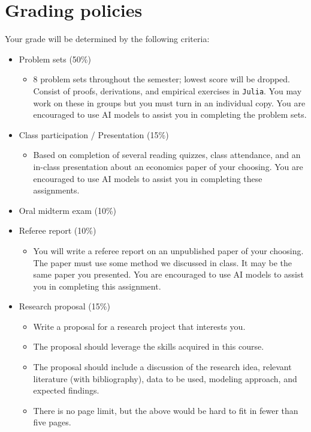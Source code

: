 \documentclass[11pt,english]{article}
\begin{document}
\section*{Grading policies}

Your grade will be determined by the following criteria:

\begin{itemize}
\item Problem sets (50\%)
    \begin{itemize}
        \item 8 problem sets throughout the semester; lowest score will be dropped. Consist of proofs, derivations, and empirical exercises in \texttt{Julia}. You may work on these in groups but you must turn in an individual copy. You are encouraged to use AI models to assist you in completing the problem sets.
    \end{itemize}
\item Class participation / Presentation (15\%)
    \begin{itemize}
        \item Based on completion of several reading quizzes, class attendance, and an in-class presentation about an economics paper of your choosing. You are encouraged to use AI models to assist you in completing these assignments.
    \end{itemize}
\item Oral midterm exam (10\%)
\item Referee report (10\%)
    \begin{itemize}
        \item You will write a referee report on an unpublished paper of your choosing. The paper must use some method we discussed in class. It may be the same paper you presented. You are encouraged to use AI models to assist you in completing this assignment.
    \end{itemize}
\item Research proposal (15\%)
    \begin{itemize}
        \item Write a proposal for a research project that interests you.
        \item The proposal should leverage the skills acquired in this course.
        \item The proposal should include a discussion of the research idea, relevant literature (with bibliography), data to be used, modeling approach, and expected findings.
        \item There is no page limit, but the above would be hard to fit in fewer than five pages.

\end{itemize}
\end{itemize}
\end{document}
